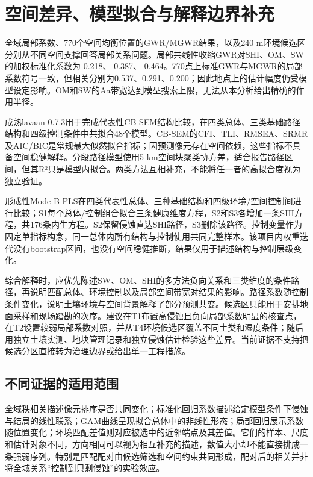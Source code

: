 \documentclass[
  a4paper,
  12pt]{ctexart}
\begin{document}
\hypertarget{ux7a7aux95f4ux5deeux5f02ux6a21ux578bux62dfux5408ux4e0eux89e3ux91caux8fb9ux754cux8865ux5145}{%
\section{空间差异、模型拟合与解释边界补充}\label{ux7a7aux95f4ux5deeux5f02ux6a21ux578bux62dfux5408ux4e0eux89e3ux91caux8fb9ux754cux8865ux5145}}

全域局部系数、770个空间均衡位置的GWR/MGWR结果，以及240
m环境候选区分别从不同空间支撑回答局部关系问题。局部共线性收缩GWR对SHI、OM、SW的加权标准化系数为-0.218、-0.387、-0.464。770点上标准GWR与MGWR的局部系数符号一致，但相关分别为0.537、0.291、0.200；因此地点上的估计幅度仍受模型设定影响。OM和SW的Aa带宽达到模型搜索上限，无法从本分析给出精确的作用半径。

成熟lavaan
0.7.3用于完成代表性CB-SEM结构比较，在四类总体、三类基础路径结构和四级控制条件中共拟合48个模型。CB-SEM的CFI、TLI、RMSEA、SRMR及AIC/BIC是常规最大似然拟合指标；因预测像元存在空间依赖，这些指标不具备空间稳健解释。分段路径模型使用5
km空间块聚类协方差，适合报告路径区间，但其R²只是模型内拟合。两类方法互相补充，不能将任一者的高拟合度视为独立验证。

形成性Mode-B
PLS在四类代表性总体、三种基础结构和四级环境/空间控制间进行比较；S1每个总体/控制组合拟合三条健康维度方程，S2和S3各增加一条SHI方程，共176条内生方程。S2保留侵蚀直达SHI路径，S3删除该路径。控制变量作为固定单指标构念，同一总体内所有结构与控制使用共同完整样本。该项目内权重迭代没有bootstrap区间，也没有空间稳健推断，结果仅用于描述结构与控制层级变化。

综合解释时，应优先陈述SW、OM、SHI的多方法负向关系和三类维度的条件路径，再说明匹配总体、环境控制以及局部空间带宽对结果的影响。路径系数随控制条件变化，说明土壤环境与空间背景解释了部分预测共变。候选区只能用于安排地面采样和现场踏勘的次序。建议在T1布置高侵蚀且负向局部系数明显的核查点，在T2设置较弱局部系数对照，并从T4环境候选区覆盖不同土类和湿度条件；随后用独立土壤实测、地块管理记录和独立侵蚀估计检验这些差异。当前证据不支持把候选分区直接转为治理边界或给出单一工程措施。

\hypertarget{ux4e0dux540cux8bc1ux636eux7684ux9002ux7528ux8303ux56f4}{%
\subsection{不同证据的适用范围}\label{ux4e0dux540cux8bc1ux636eux7684ux9002ux7528ux8303ux56f4}}

全域秩相关描述像元排序是否共同变化；标准化回归系数描述给定模型条件下侵蚀与结局的线性联系；GAM曲线呈现拟合总体中的非线性形态；局部回归展示系数随位置变化；环境匹配差值则对应被选中的近邻端点及其差值。它们的样本、尺度和估计对象不同，方向相同可以视为相互补充的描述，数值大小却不能直接排成一条强弱序列。特别是匹配配对由候选筛选和空间约束共同形成，配对后的相关并非将全域关系``控制到只剩侵蚀''的实验效应。
\end{document}

